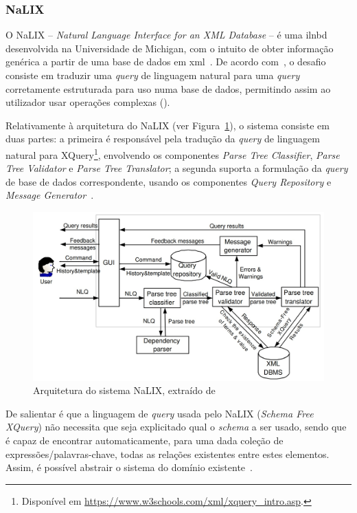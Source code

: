 \subsubsection*{NaLIX}
O NaLIX -- \textit{Natural Language Interface for an XML Database} -- é uma \gls{ilnbd} desenvolvida na Universidade de Michigan, com o intuito de obter informação genérica a partir de uma base de dados em \gls{xml}~\parencite{nalix_interactive_nli_querying_xml}. De acordo com~\textcite{nalix_interactive_nli_querying_xml}, o desafio consiste em traduzir uma \textit{query} de linguagem natural para uma \textit{query} corretamente estruturada para uso numa base de dados, permitindo assim ao utilizador usar operações complexas ().

Relativamente à arquitetura do NaLIX (ver Figura~\ref{fig:nalix_architecture}), o sistema consiste em duas partes: a primeira é responsável pela tradução da \textit{query} de linguagem natural para XQuery\footnote{Disponível em \url{https://www.w3schools.com/xml/xquery_intro.asp}.}, envolvendo os componentes \textit{Parse Tree Classifier}, \textit{Parse Tree Validator} e \textit{Parse Tree Translator}; a segunda suporta a formulação da \textit{query} de base de dados correspondente, usando os componentes \textit{Query Repository} e \textit{Message Generator}~\parencite{nalix_interactive_nli_querying_xml}.
%
\begin{figure}
    \centering
    \includegraphics[width=.8\textwidth]{ch03/assets/nalix_architecture.jpg}
    \caption{Arquitetura do sistema NaLIX, extraído de~\textcite{nalix_interactive_nli_querying_xml}}
    \label{fig:nalix_architecture}
\end{figure}

De salientar é que a linguagem de \textit{query} usada pelo NaLIX (\textit{Schema Free XQuery}) não necessita que seja explicitado qual o \textit{schema} a ser usado, sendo que é capaz de encontrar automaticamente, para uma dada coleção de expressões/palavras-chave, todas as relações existentes entre estes elementos. Assim, é possível abstrair o sistema do domínio existente~\parencite{nalix_interactive_nli_querying_xml, survey_nlidb}.

